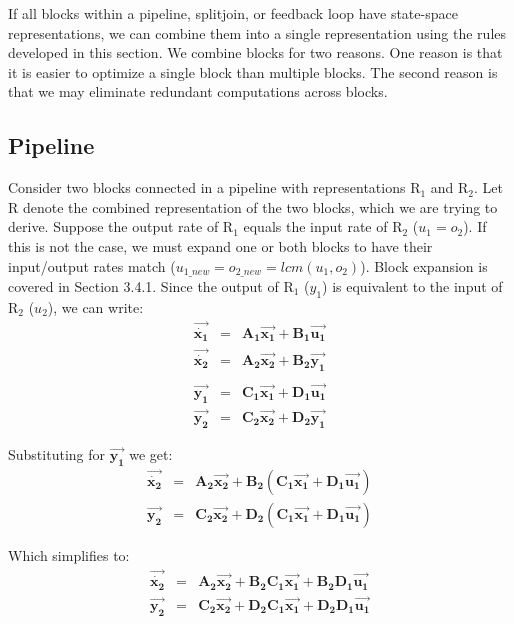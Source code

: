     If all blocks within a pipeline, splitjoin, or feedback loop have state-space
representations, we can combine them into a single representation
using the rules developed in this section. We combine blocks for
two reasons. One reason is that it is easier to optimize a single
block than multiple blocks. The second reason is that we may
eliminate redundant computations across blocks.

\subsection{Pipeline}

    Consider two blocks connected in a pipeline with representations
$\mathrm{R_1}$ and $\mathrm{R_2}$. Let $\mathrm{R}$ denote the
combined representation of the two blocks, which we are trying to
derive. Suppose the output rate of $\mathrm{R_1}$ equals the input
rate of $\mathrm{R_2}$ ($u_1 = o_2$). If this is not the case, we
must expand one or both blocks to have their input/output rates
match ($u_{1\_new} = o_{2\_new} = lcm(u_1,o_2)$). Block expansion
is covered in Section 3.4.1. Since the output of $\mathrm{R_1}$
($y_1$) is equivalent to the input of $\mathrm{R_2}$ ($u_2$), we
can write:
\begin{eqnarray*}
\vec{\dot{\mathbf{x_1}}} & = & \mathbf{A_1}\vec{\mathbf{x_1}} + \mathbf{B_1}\vec{\mathbf{u_1}} \\
\vec{\dot{\mathbf{x_2}}} & = & \mathbf{A_2}\vec{\mathbf{x_2}} + \mathbf{B_2}\vec{\mathbf{y_1}} \\
\\
\vec{\mathbf{y_1}} & = & \mathbf{C_1}\vec{\mathbf{x_1}} + \mathbf{D_1}\vec{\mathbf{u_1}} \\
\vec{\mathbf{y_2}} & = & \mathbf{C_2}\vec{\mathbf{x_2}} +
\mathbf{D_2}\vec{\mathbf{y_1}}
\end{eqnarray*}

Substituting for $\vec{\mathbf{y_1}}$ we get:
\begin{eqnarray*}
\vec{\dot{\mathbf{x_2}}} & = & \mathbf{A_2}\vec{\mathbf{x_2}} + \mathbf{B_2}(\mathbf{C_1}\vec{\mathbf{x_1}} + \mathbf{D_1}\vec{\mathbf{u_1}}) \\
\vec{\mathbf{y_2}} & = & \mathbf{C_2}\vec{\mathbf{x_2}} +
\mathbf{D_2}(\mathbf{C_1}\vec{\mathbf{x_1}} +
\mathbf{D_1}\vec{\mathbf{u_1}})
\end{eqnarray*}

Which simplifies to:
\begin{eqnarray*}
\vec{\dot{\mathbf{x_2}}} & = & \mathbf{A_2}\vec{\mathbf{x_2}} + \mathbf{B_2}\mathbf{C_1}\vec{\mathbf{x_1}} + \mathbf{B_2}\mathbf{D_1}\vec{\mathbf{u_1}} \\
\vec{\mathbf{y_2}} & = & \mathbf{C_2}\vec{\mathbf{x_2}} +
\mathbf{D_2}\mathbf{C_1}\vec{\mathbf{x_1}} +
\mathbf{D_2}\mathbf{D_1}\vec{\mathbf{u_1}}
\end{eqnarray*}

